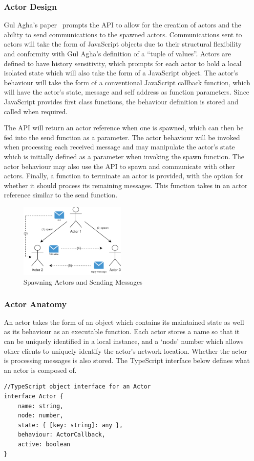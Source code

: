 \documentclass[lettersize,journal]{IEEEtran}
\begin{document}
\subsubsection{Actor Design}
Gul Agha's paper~\cite{agha1985actors} prompts the API to allow for the creation of actors and the ability to send communications to the spawned actors. Communications sent to actors will take the form of JavaScript objects due to their structural flexibility and conformity with Gul Agha's definition of a “tuple of values”. Actors are defined to have history sensitivity, which prompts for each actor to hold a local isolated state which will also take the form of a JavaScript object. The actor's behaviour will take the form of a conventional JavaScript callback function, which will have the actor's state, message and self address as function parameters. Since JavaScript provides first class functions, the behaviour definition is stored and called when required.

The API will return an actor reference when one is spawned, which can then be fed into the send function as a parameter. The actor behaviour will be invoked when processing each received message and may manipulate the actor's state which is initially defined as a parameter when invoking the spawn function. The actor behaviour may also use the API to spawn and communicate with other actors. Finally, a function to terminate an actor is provided, with the option for whether it should process its remaining messages. This function takes in an actor reference similar to the send function.
\begin{figure}[H]
    \begin{centering}
        \includegraphics[width=200px]{resources/actors.png}
        \caption{Spawning Actors and Sending Messages}\label{fig:actors}
    \end{centering}
\end{figure}
\subsubsection{Actor Anatomy}
An actor takes the form of an object which contains its maintained state as well as its behaviour as an executable function. Each actor stores a name so that it can be uniquely identified in a local instance, and a `node' number which allows other clients to uniquely identify the actor's network location. Whether the actor is processing messages is also stored. The TypeScript interface below defines what an actor is composed of.
\begin{lstlisting}
//TypeScript object interface for an Actor
interface Actor {
    name: string,             
    node: number,             
    state: { [key: string]: any },  
    behaviour: ActorCallback,
    active: boolean          
}
\end{lstlisting}
\end{document}
